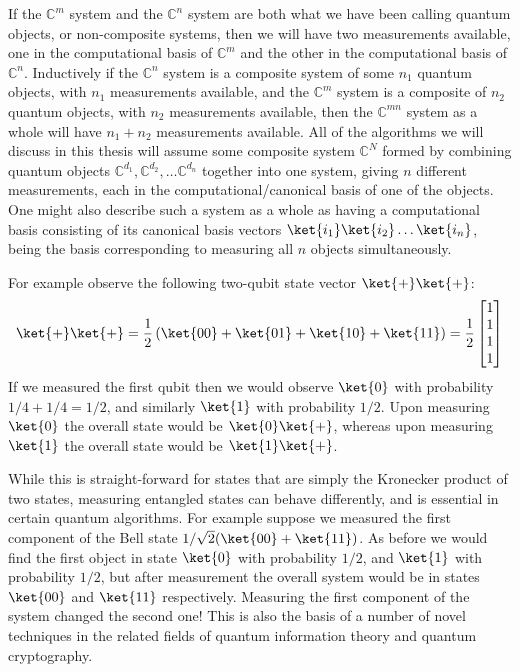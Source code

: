 If the $\mathbb{C}^m$ system and the $\mathbb{C}^n$ system are both what we have been calling quantum objects, or non-composite systems, then we will have two measurements available, one in the computational basis of $\mathbb{C}^m$ and the other in the computational basis of $\mathbb{C}^n$. Inductively if the $\mathbb{C}^n$ system is a composite system of some $n_1$ quantum objects, with $n_1$ measurements available, and the $\mathbb{C}^m$ system is a composite of $n_2$ quantum objects, with $n_2$ measurements available, then the $\mathbb{C}^{mn}$ system as a whole will have $n_1 + n_2$ measurements available. All of the algorithms we will discuss in this thesis will assume some composite system $\mathbb{C}^N$ formed by combining quantum objects $\mathbb{C}^{d_1}, \mathbb{C}^{d_2}, \dots \mathbb{C}^{d_n}$ together into one system, giving $n$ different measurements, each in the computational/canonical basis of one of the objects. One might also describe such a system as a whole as having a computational basis consisting of its canonical basis vectors $\ket{i_1}\ket{i_2}\dots\ket{i_n}$, being the basis corresponding to measuring all $n$ objects simultaneously.

For example observe the following two-qubit state vector $\ket{+}\ket{+}$:
\[\ket{+}\ket{+}=\frac{1}{2}\left(\ket{00}+\ket{01}+\ket{10}+\ket{11}\right)=\frac{1}{2}\left[\begin{matrix}
1\\
1\\
1\\
1
\end{matrix}\right]\]
If we measured the first qubit then we would observe $\ket{0}$ with probability $1/4+1/4 = 1/2$, and similarly $\ket{1}$ with probability $1/2$. Upon measuring $\ket{0}$ the overall state would be $\ket{0}\ket{+}$, whereas upon measuring $\ket{1}$ the overall state would be $\ket{1}\ket{+}$.

While this is straight-forward for states that are simply the Kronecker product of two states, measuring entangled states can behave differently, and is essential in certain quantum algorithms. For example suppose we measured the first component of the Bell state $1/\sqrt{2}(\ket{00}+\ket{11})$. As before we would find the first object in state $\ket{0}$ with probability $1/2$, and $\ket{1}$ with probability $1/2$, but after measurement the overall system would be in states $\ket{00}$ and $\ket{11}$ respectively. Measuring the first component of the system changed the second one! This is also the basis of a number of novel techniques in the related fields of quantum information theory and quantum cryptography.

